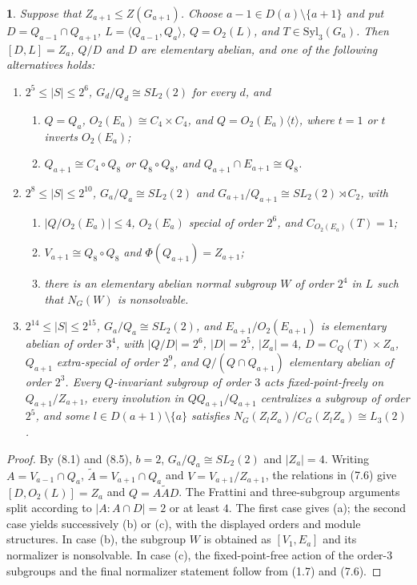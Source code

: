 \documentclass[11pt]{article}
\theoremstyle{plain}
\theoremstyle{stmplain}
\newtheorem{stm}{}[section]
\begin{document}
\begin{stm}\label{st:8.6}
Suppose that $Z_{a+1}\le Z(G_{a+1})$. Choose
$a-1\in D(a)\setminus\{a+1\}$ and put
$D=Q_{a-1}\cap Q_{a+1}$, $L=\langle Q_{a-1},Q_a\rangle$,
$Q=O_2(L)$, and $T\in\mathrm{Syl}_3(G_a)$. Then
$[D,L]=Z_a$, $Q/D$ and $D$ are elementary abelian, and one of the
following alternatives holds:
\begin{enumerate}
\item[(a)] $2^5\le |S|\le2^6$, $G_d/Q_d\cong SL_2(2)$ for every $d$, and
  \begin{enumerate}
  \item[(a$_1$)] $Q=Q_a$, $O_2(E_a)\cong C_4\times C_4$, and
    $Q=O_2(E_a)\langle t\rangle$, where $t=1$ or $t$ inverts
    $O_2(E_a)$;
  \item[(a$_2$)] $Q_{a+1}\cong C_4\circ Q_8$ or $Q_8\circ Q_8$, and
    $Q_{a+1}\cap E_{a+1}\cong Q_8$.
  \end{enumerate}
\item[(b)] $2^8\le |S|\le2^{10}$,
  $G_a/Q_a\cong SL_2(2)$ and
  $G_{a+1}/Q_{a+1}\cong SL_2(2)\rtimes C_2$, with
  \begin{enumerate}
  \item[(b$_1$)] $|Q/O_2(E_a)|\le4$, $O_2(E_a)$ special of order $2^6$,
    and $C_{O_2(E_a)}(T)=1$;
  \item[(b$_2$)] $V_{a+1}\cong Q_8\circ Q_8$ and
    $\Phi(Q_{a+1})=Z_{a+1}$;
  \item[(b$_3$)] there is an elementary abelian normal subgroup $W$ of
    order $2^4$ in $L$ such that $N_G(W)$ is nonsolvable.
  \end{enumerate}
\item[(c)] $2^{14}\le |S|\le2^{15}$,
  $G_a/Q_a\cong SL_2(2)$, and $E_{a+1}/O_2(E_{a+1})$ is elementary
  abelian of order $3^4$, with
  $|Q/D|=2^6$, $|D|=2^5$, $|Z_a|=4$, $D=C_Q(T)\times Z_a$,
  $Q_{a+1}$ extra-special of order $2^9$, and $Q/(Q\cap Q_{a+1})$
  elementary abelian of order $2^3$. Every $Q$-invariant subgroup of
  order $3$ acts fixed-point-freely on $Q_{a+1}/Z_{a+1}$, every
  involution in $QQ_{a+1}/Q_{a+1}$ centralizes a subgroup of order $2^5$,
  and some $l\in D(a+1)\setminus\{a\}$ satisfies
  $N_G(Z_lZ_a)/C_G(Z_lZ_a)\cong L_3(2)$.
\end{enumerate}
\end{stm}

\begin{proof}
By (8.1) and (8.5), $b=2$, $G_a/Q_a\cong SL_2(2)$ and $|Z_a|=4$.
Writing $A=V_{a-1}\cap Q_a$, $\widetilde A=V_{a+1}\cap Q_a$ and
$V=V_{a+1}/Z_{a+1}$, the relations in (7.6) give
$[D,O_2(L)]=Z_a$ and $Q=A\widetilde A D$. The Frattini and
three-subgroup arguments split according to
$|A:A\cap D|=2$ or at least $4$. The first case gives (a); the second
case yields successively (b) or (c), with the displayed orders and module
structures. In case (b), the subgroup $W$ is obtained as
$[V_1,E_a]$ and its normalizer is nonsolvable. In case (c), the
fixed-point-free action of the order-$3$ subgroups and the final
normalizer statement follow from (1.7) and (7.6).
\end{proof}
\end{document}

